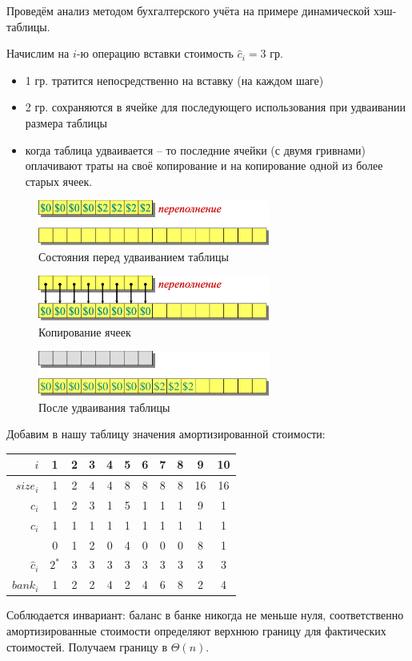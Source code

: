 \documentclass[a4paper,11pt]{article}
\begin{document}
Проведём анализ методом бухгалтерского учёта на примере динамической
хэш-таблицы.

Начислим на $i$-ю операцию вставки стоимость $\hat{c}_i = 3$ гр.
\begin{itemize}
\item 1 гр. тратится непосредственно на вставку (на каждом шаге)
\item 2 гр. сохраняются в ячейке для последующего использования при удваивании
  размера таблицы
\item когда таблица удваивается -- то последние ячейки (с двумя гривнами)
  оплачивают траты на своё копирование и на копирование одной из более старых ячеек.
\end{itemize}

\begin{figure}[ht]
  \centering
  \includegraphics[width=3in]{lecture13/accountant1.eps}
  \caption{Состояния перед удваиванием таблицы}
  \label{fig:acc1}
\end{figure}

\begin{figure}[ht]
  \centering
  \includegraphics[width=3in]{lecture13/accountant2.eps}
  \caption{Копирование ячеек}
  \label{fig:acc2}
\end{figure}

\begin{figure}[ht]
  \centering
  \includegraphics[width=3in]{lecture13/accountant3.eps}
  \caption{После удваивания таблицы}
  \label{fig:acc3}
\end{figure}

Добавим в нашу таблицу значения амортизированной стоимости:

\begin{center}
\begin{tabular}{|r|c|c|c|c|c|c|c|c|c|c|}
  \hline
      $i$ & 1 & 2 & 3 & 4 & 5 & 6 & 7 & 8 & 9  & 10 \\
  \hline
 $size_i$ & 1 & 2 & 4 & 4 & 8 & 8 & 8 & 8 & 16 & 16 \\
  \hline
    $c_i$ & 1 & 2 & 3 & 1 & 5 & 1 & 1 & 1 & 9  & 1 \\
  \hline
    $c_i$ & 1 & 1 & 1 & 1 & 1 & 1 & 1 & 1 & 1 & 1 \\
          & 0 & 1 & 2 & 0 & 4 & 0 & 0 & 0 & 8 & 1 \\
  \hline
$\hat{c}_i$ & $2^*$ & 3 & 3 & 3 & 3 & 3 & 3 & 3 & 3 & 3 \\
  \hline
   $bank_i$ & 1 & 2 & 2 & 4 & 2 & 4 & 6 & 8 & 2 & 4 \\  
  \hline
\end{tabular}
\end{center}

Соблюдается инвариант: баланс в банке никогда не меньше нуля, соответственно
амортизированные стоимости определяют верхнюю границу для фактических
стоимостей. Получаем границу в $\Theta(n)$.
\end{document}
